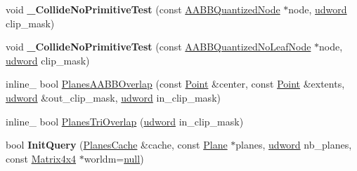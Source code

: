 \begin{DoxyCompactItemize}
\item 
void {\bfseries \+\_\+\+Collide\+No\+Primitive\+Test} (const \hyperlink{classAABBQuantizedNode}{A\+A\+B\+B\+Quantized\+Node} $\ast$node, \hyperlink{IceTypes_8h_a44c6f1920ba5551225fb534f9d1a1733}{udword} clip\+\_\+mask)\hypertarget{classPlanesCollider_a2c3e44827c703c4e97e224533c0b030c}{}\label{classPlanesCollider_a2c3e44827c703c4e97e224533c0b030c}

\item 
void {\bfseries \+\_\+\+Collide\+No\+Primitive\+Test} (const \hyperlink{classAABBQuantizedNoLeafNode}{A\+A\+B\+B\+Quantized\+No\+Leaf\+Node} $\ast$node, \hyperlink{IceTypes_8h_a44c6f1920ba5551225fb534f9d1a1733}{udword} clip\+\_\+mask)\hypertarget{classPlanesCollider_a3b4960caf24415388d68e458225bf4db}{}\label{classPlanesCollider_a3b4960caf24415388d68e458225bf4db}

\item 
inline\+\_\+ bool \hyperlink{classPlanesCollider_a2980988c2e5d05ce5b458779a312c875}{Planes\+A\+A\+B\+B\+Overlap} (const \hyperlink{classPoint}{Point} \&center, const \hyperlink{classPoint}{Point} \&extents, \hyperlink{IceTypes_8h_a44c6f1920ba5551225fb534f9d1a1733}{udword} \&out\+\_\+clip\+\_\+mask, \hyperlink{IceTypes_8h_a44c6f1920ba5551225fb534f9d1a1733}{udword} in\+\_\+clip\+\_\+mask)
\item 
inline\+\_\+ bool \hyperlink{classPlanesCollider_ae9134f553dbd39863f10e4b649fdb090}{Planes\+Tri\+Overlap} (\hyperlink{IceTypes_8h_a44c6f1920ba5551225fb534f9d1a1733}{udword} in\+\_\+clip\+\_\+mask)
\item 
bool {\bfseries Init\+Query} (\hyperlink{structPlanesCache}{Planes\+Cache} \&cache, const \hyperlink{classPlane}{Plane} $\ast$planes, \hyperlink{IceTypes_8h_a44c6f1920ba5551225fb534f9d1a1733}{udword} nb\+\_\+planes, const \hyperlink{classMatrix4x4}{Matrix4x4} $\ast$worldm=\hyperlink{IceTypes_8h_ac97b8ee753e4405397a42ad5799b0f9e}{null})\hypertarget{classPlanesCollider_a1d103b95a7eff849473aa7906d6b6f54}{}\label{classPlanesCollider_a1d103b95a7eff849473aa7906d6b6f54}

\end{DoxyCompactItemize}

